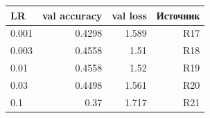 \begin{tabular}{lrrr}
\toprule
LR & val accuracy & val loss & Источник \\
\midrule
0.001 & 0.4298 & 1.589 & R17 \\
0.003 & 0.4558 & 1.51 & R18 \\
0.01 & 0.4558 & 1.52 & R19 \\
0.03 & 0.4498 & 1.561 & R20 \\
0.1 & 0.37 & 1.717 & R21 \\
\bottomrule
\end{tabular}